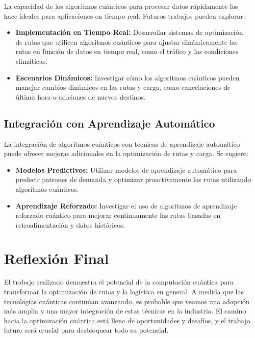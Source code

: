 \documentclass[11pt,a4paper,spanish]{book}
\begin{document}
La capacidad de los algoritmos cuánticos para procesar datos rápidamente los hace ideales para aplicaciones en tiempo real. Futuros trabajos pueden explorar:

\begin{itemize}
    \item \textbf{Implementación en Tiempo Real:} Desarrollar sistemas de optimización de rutas que utilicen algoritmos cuánticos para ajustar dinámicamente las rutas en función de datos en tiempo real, como el tráfico y las condiciones climáticas.
    \item \textbf{Escenarios Dinámicos:} Investigar cómo los algoritmos cuánticos pueden manejar cambios dinámicos en las rutas y carga, como cancelaciones de última hora o adiciones de nuevos destinos.
\end{itemize}

\subsection{Integración con Aprendizaje Automático}

La integración de algoritmos cuánticos con técnicas de aprendizaje automático puede ofrecer mejoras adicionales en la optimización de rutas y carga. Se sugiere:

\begin{itemize}
    \item \textbf{Modelos Predictivos:} Utilizar modelos de aprendizaje automático para predecir patrones de demanda y optimizar proactivamente las rutas utilizando algoritmos cuánticos.
    \item \textbf{Aprendizaje Reforzado:} Investigar el uso de algoritmos de aprendizaje reforzado cuántico para mejorar continuamente las rutas basadas en retroalimentación y datos históricos.
\end{itemize}

\section{Reflexión Final}

El trabajo realizado demuestra el potencial de la computación cuántica para transformar la optimización de rutas y la logística en general. A medida que las tecnologías cuánticas continúan avanzando, es probable que veamos una adopción más amplia y una mayor integración de estas técnicas en la industria. El camino hacia la optimización cuántica está lleno de oportunidades y desafíos, y el trabajo futuro será crucial para desbloquear todo su potencial.
\end{document}
